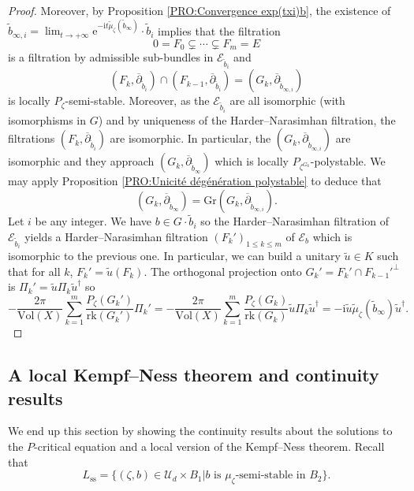 \documentclass{article}
\theoremstyle{remark}
\theoremstyle{definition}
\newcommand{\rk}{\mathrm{rk}}
\newcommand{\Vol}{\mathrm{Vol}}
\renewcommand{\i}{\boldsymbol{\mathrm{i}}}
\newcommand{\e}{\boldsymbol{\mathrm{e}}}
\newcommand{\E}{\mathcal{E}}
\newcommand{\mU}{\mathcal{U}}
\newcommand{\dbar}{\overline{\partial}}
\renewcommand{\leq}{\leqslant}
\begin{document}
\begin{proof}
Moreover, by Proposition \ref{PRO:Convergence exp(txi)b}, the existence of $\tilde{b}_{\infty,i} = \lim_{t \rightarrow +\infty} \e^{-\i t\tilde{\mu}_\zeta(\tilde{b}_\infty)} \cdot \tilde{b}_i$ implies that the filtration
$$
0 = F_0 \subsetneq \cdots \subsetneq F_m = E
$$
is a filtration by admissible sub-bundles in $\E_{\tilde{b}_i}$ and
$$
(F_k,\dbar_{\tilde{b}_i}) \cap (F_{k - 1},\dbar_{\tilde{b}_i}) = (G_k,\dbar_{\tilde{b}_{\infty,i}})
$$
is locally $P_\zeta$-semi-stable. Moreover, as the $\E_{\tilde{b}_i}$ are all isomorphic (with isomorphisms in $G$) and by uniqueness of the Harder--Narasimhan filtration, the filtrations $(F_k,\dbar_{\tilde{b}_i})$ are isomorphic. In particular, the $(G_k,\dbar_{\tilde{b}_{\infty,i}})$ are isomorphic and they approach $(G_k,\dbar_{\tilde{b}_\infty})$ which is locally $P_{\zeta^{G_k}}$-polystable. We may apply Proposition \ref{PRO:Unicité dégénération polystable} to deduce that
$$
(G_k,\dbar_{\tilde{b}_\infty}) = \mathrm{Gr}(G_k,\dbar_{\tilde{b}_{\infty,i}}).
$$
Let $i$ be any integer. We have $b \in G \cdot \tilde{b}_i$ so the Harder--Narasimhan filtration of $\E_{\tilde{b}_i}$ yields a Harder--Narasimhan filtration $(F_k')_{1 \leq k \leq m}$ of $\E_b$ which is isomorphic to the previous one. In particular, we can build a unitary $\tilde{u} \in K$ such that for all $k$, $F_k' = \tilde{u}(F_k)$. The orthogonal projection onto $G_k' = F_k' \cap {F_{k - 1}'}^\bot$ is $\Pi_k' = \tilde{u}\Pi_k\tilde{u}^\dagger$ so
$$
-\frac{2\pi}{\Vol(X)}\sum_{k = 1}^m \frac{P_\zeta(G_k')}{\rk(G_k')}\Pi_k' = -\frac{2\pi}{\Vol(X)}\sum_{k = 1}^m \frac{P_\zeta(G_k)}{\rk(G_k)}\tilde{u}\Pi_k\tilde{u}^\dagger = -\i\tilde{u}\tilde{\mu}_\zeta(\tilde{b}_\infty)\tilde{u}^\dagger.
$$
\end{proof}

\subsection{A local Kempf--Ness theorem and continuity results}

We end up this section by showing the continuity results about the solutions to the $P$-critical equation and a local version of the Kempf--Ness theorem. Recall that
$$
L_{\mathrm{ss}} = \{(\zeta,b) \in \mU_d \times B_1|b \textrm{ is $\mu_\zeta$-semi-stable in } B_2\}.
$$
\end{document}
